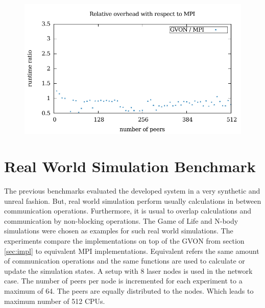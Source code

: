 \begin{figure}[H]
\begin{minipage}[t]{0.5\textwidth}
    \includegraphics[width=\textwidth]{plots/50_reduce_network_overhead_gvon_laser}
  \end{minipage}%
  \caption{ }
  \label{fig:reduce_laser}
\end{figure}


\section{Real World Simulation Benchmark}
\label{sec:eval:real}
The previous benchmarks evaluated the developed system in a very
synthetic and unreal fashion. But, real world simulation perform
usually calculations in between communication operations. Furthermore,
it is usual to overlap calculations and communication by non-blocking
operations. The Game of Life and N-body simulations were chosen as
examples for such real world simulations. The experiments compare the
implementations on top of the GVON from section \ref{sec:impl} to
equivalent MPI implementations.  Equivalent refers the same amount of
communication operations and the same functions are used to calculate
or update the simulation states. A setup with 8 laser nodes is used in
the network case. The number of peers per node is incremented for each
experiment to a maximum of 64. The peers are equally distributed to
the nodes.  Which leads to maximum number of 512 CPUs. 


